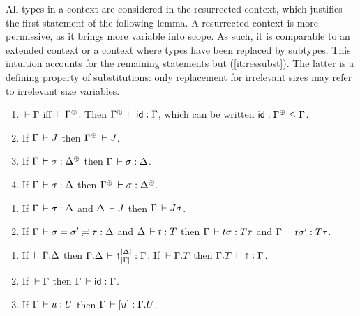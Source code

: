 \documentclass[acmsmall%
]{acmart}\settopmatter{printfolios=true}
\begin{document}
All types in a context are considered in the resurrected context,
which justifies the first statement of the following lemma.
A resurrected context is more permissive, as it brings more variable
into scope.  As such, it is comparable to an extended context or a
context where types have been replaced by subtypes.  This intuition
accounts for the remaining statements but (\ref{it:ressubst}).  The
latter is a defining property of substitutions: only replacement for
irrelevant sizes may refer to irrelevant size variables.
\begin{lemma}[Resurrection]
\label{lem:res} \bla
\begin{enumerate}
\item \label{it:reswf} $\,\vdash \Gamma$ iff $\der \resurrect\Gamma$.
  Then $\resurrect \Gamma \der \sid : \Gamma$, which can be written
  $\sid : \resurrect\Gamma \leq \Gamma$.
\item If\/ $\Gamma \,\vdash J$ then $\resurrect \Gamma \der J$.
\item If\/ $\Gamma \der \sigma : \resurrect \Delta$ %
  then $\Gamma \,\vdash \sigma : \Delta$.
\item \label{it:ressubst} If\/ $\Gamma \,\vdash \sigma : \Delta$ %
  then $\resurrect\Gamma \der \sigma : \resurrect\Delta$.
\end{enumerate}
\end{lemma}

\begin{lemma}[Substitution]
\label{lem:sub}\bla
\begin{enumerate}
\item
  If\/ $\Gamma \,\vdash \sigma : \Delta$ and $\Delta \,\vdash J$ then $\Gamma \,\vdash J\sigma$.
\item
  If\/ $\Gamma \,\vdash \sigma = \sigma' \risingdotseq \tau : \Delta$ and $\Delta \,\vdash t : T$ then
  $\Gamma \,\vdash t\sigma : T\tau$ and $\Gamma \,\vdash t\sigma' : T\tau$.
\end{enumerate}
\end{lemma}

\begin{lemma}
\label{lem:specsub}\bla
\begin{enumerate}
\item If\/ $\,\vdash \Gamma. \Delta$ then $\Gamma. \Delta \,\vdash \mathord{\shortuparrow}_{|\Gamma|}^{|\Delta|} : \Gamma$.
      If\/ $\,\vdash \Gamma. T$ then $\Gamma. T \,\vdash \mathord{\shortuparrow} : \Gamma$.
\item If\/ $\,\vdash \Gamma$ then $\Gamma \,\vdash \mathsf{id} : \Gamma$.
\item If\/ $\Gamma \,\vdash u : U$ then $\Gamma \,\vdash [u] : \Gamma. U$.
\end{enumerate}
\end{lemma}
\end{document}
